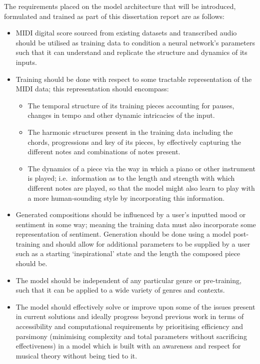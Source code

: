 \documentclass[12pt,]{article}
\providecommand{\tightlist}{%
  \setlength{\itemsep}{0pt}\setlength{\parskip}{0pt}}
\begin{document}
The requirements placed on the model architecture that will be
introduced, formulated and trained as part of this dissertation report
are as follows:

\begin{itemize}
\tightlist
\item
  MIDI digital score sourced from existing datasets and transcribed
  audio should be utilised as training data to condition a neural
  network's parameters such that it can understand and replicate the
  structure and dynamics of its inputs.
\item
  Training should be done with respect to some tractable representation
  of the MIDI data; this representation should encompass:

  \begin{itemize}
  \tightlist
  \item
    The temporal structure of its training pieces accounting for pauses,
    changes in tempo and other dynamic intricacies of the input.
  \item
    The harmonic structures present in the training data including the
    chords, progressions and key of its pieces, by effectively capturing
    the different notes and combinations of notes present.
  \item
    The dynamics of a piece via the way in which a piano or other
    instrument is played; i.e.~information as to the length and strength
    with which different notes are played, so that the model might also
    learn to play with a more human-sounding style by incorporating this
    information.
  \end{itemize}
\item
  Generated compositions should be influenced by a user's inputted mood
  or sentiment in some way; meaning the training data must also
  incorporate some representation of sentiment. Generation should be
  done using a model post-training and should allow for additional
  parameters to be supplied by a user such as a starting `inspirational'
  state and the length the composed piece should be.
\item
  The model should be independent of any particular genre or
  pre-training, such that it can be applied to a wide variety of genres
  and contexts.
\item
  The model should effectively solve or improve upon some of the issues
  present in current solutions and ideally progress beyond previous work
  in terms of accessibility and computational requirements by
  prioritising efficiency and parsimony (minimising complexity and total
  parameters without sacrificing effectiveness) in a model which is
  built with an awareness and respect for musical theory without being
  tied to it.
\end{itemize}
\end{document}
